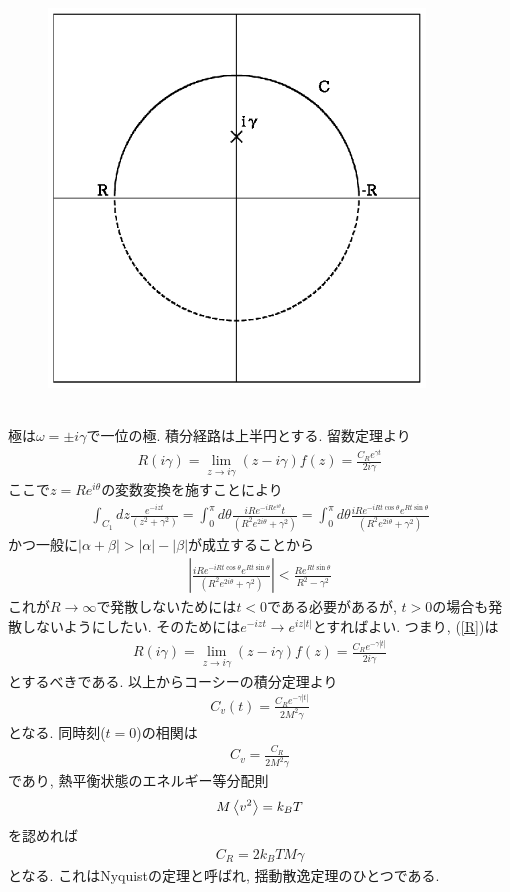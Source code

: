 \documentclass[10.5pt,a4paper]{jreport}
\begin{document}
\begin{figure}[htbp]
  \centering
  \includegraphics[width = 10cm]{./figure3new.eps}
  \label{fig3}
\end{figure}\\
極は$\omega = \pm i\gamma$で一位の極. 積分経路は上半円とする. 留数定理より
\begin{eqnarray}
  R(i\gamma) = \lim_{z\rightarrow i\gamma}(z - i\gamma)f(z) = \frac{C_Re^{\gamma t}}{2i\gamma}\label{R}
\end{eqnarray}
ここで$z = Re^{i\theta}$の変数変換を施すことにより
\begin{eqnarray}
  \int_{C_1}dz\frac{e^{-izt}}{(z^2 + \gamma^2)} = \int_0^\pi d\theta\frac{iRe^{-iRe^{i\theta}}t}{(R^2e^{2i\theta} + \gamma^2)}= \int_0^\pi d\theta\frac{iRe^{-iRt\cos\theta}e^{Rt\sin\theta}}{(R^2e^{2i\theta} + \gamma^2)}
\end{eqnarray}
かつ一般に$|\alpha + \beta| > |\alpha|-|\beta|$が成立することから
\begin{eqnarray}
  \left|\frac{iRe^{-iRt\cos\theta}e^{Rt\sin\theta}}{(R^2e^{2i\theta} + \gamma^2)}\right| < \frac{Re^{Rt\sin\theta}}{R^2 - \gamma^2}
\end{eqnarray}
これが$R\rightarrow\infty$で発散しないためには$t<0$である必要があるが, $t>0$の場合も発散しないようにしたい. そのためには$e^{-izt}\rightarrow e^{iz|t|}$とすればよい. つまり, (\ref{R})は
\begin{eqnarray}
  R(i\gamma) = \lim_{z\rightarrow i\gamma}(z - i\gamma)f(z) = \frac{C_Re^{-\gamma |t|}}{2i\gamma}\label{R2}
\end{eqnarray}
とするべきである. 以上からコーシーの積分定理より
\begin{eqnarray}
  C_v(t) = \frac{C_Re^{-\gamma|t|}}{2M^2\gamma}
\end{eqnarray}
となる. 同時刻($t = 0$)の相関は
\begin{eqnarray}
  C_v = \frac{C_R}{2M^2\gamma}
\end{eqnarray}
であり, 熱平衡状態のエネルギー等分配則
\begin{eqnarray}
  M\expval{v^2} = k_BT
\end{eqnarray}
を認めれば
\begin{eqnarray}
  C_R = 2k_BTM\gamma
\end{eqnarray}
となる. これはNyquistの定理と呼ばれ, 揺動散逸定理のひとつである.
\end{document}
